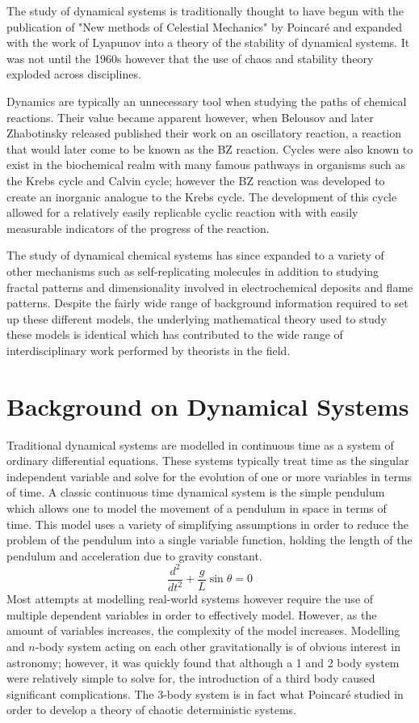 The study of dynamical systems is traditionally thought to have begun with the publication of "New methods of Celestial Mechanics" by Poincar\'e and expanded with the work of Lyapunov into a theory of the stability of dynamical systems. It was not until the 1960s however that the use of chaos and stability theory exploded across disciplines\autocite{Aubin2002}. 

Dynamics are typically an unnecessary tool when studying the paths of chemical reactions. Their value became apparent however, when Belousov and later Zhabotinsky released published their work on an oscillatory reaction, a reaction that would later come to be known as the BZ reaction\autocite{Winfree1984}. Cycles were also known to exist in the biochemical realm with many famous pathways in organisms such as the Krebs cycle and Calvin cycle; however the BZ reaction was developed to create an inorganic analogue to the Krebs cycle. The development of this cycle allowed for a relatively easily replicable cyclic reaction with with easily measurable indicators of the progress of the reaction. 

The study of dynamical chemical systems has since expanded to a variety of other mechanisms such as self-replicating molecules\autocite{Beutel2007} in addition to studying fractal patterns and dimensionality involved in electrochemical deposits and flame patterns. Despite the fairly wide range of background information required to set up these different models, the underlying mathematical theory used to study these models is identical which has contributed to the wide range of interdisciplinary work performed by theorists in the field.
\section{Background on Dynamical Systems}
Traditional dynamical systems are modelled in continuous time as a system of ordinary differential equations. These systems typically treat time as the singular independent variable and solve for the evolution of one or more variables in terms of time. A classic continuous time dynamical system is the simple pendulum which allows one to model the movement of a pendulum in space in terms of time. This model uses a variety of simplifying assumptions in order to reduce the problem of the pendulum into a single variable function, holding the length of the pendulum and acceleration due to gravity constant.
\begin{equation}
    \frac{d^2}{dt^2}+\frac{g}{L}\sin\theta=0
\end{equation}
Most  attempts  at  modelling  real-world  systems  however  require  the  use  of  multiple dependent variables in order to effectively model.  However, as the amount of variables increases, the complexity of the model increases.  Modelling and $n$-body system acting on each other gravitationally is of obvious interest in astronomy; however, it was quickly found  that  although  a  1  and  2  body  system  were  relatively  simple  to  solve  for,  the introduction of a third body caused significant complications.  The 3-body system is in fact what Poincar\'e studied in order to develop a theory of chaotic deterministic systems\autocite{Poincare1993}.

